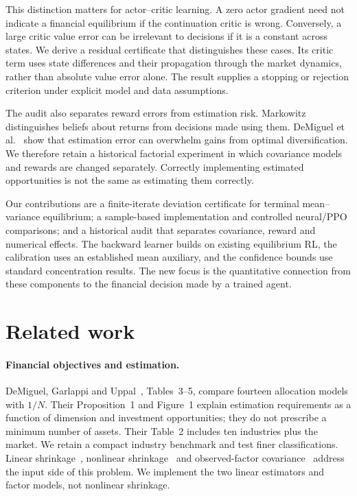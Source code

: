 \documentclass[sigconf,anonymous,review]{acmart}
\begin{document}
This distinction matters for actor--critic learning. A zero actor gradient need not indicate a financial equilibrium if the continuation critic is wrong. Conversely, a large critic value error can be irrelevant to decisions if it is a constant across states. We derive a residual certificate that distinguishes these cases. Its critic term uses state differences and their propagation through the market dynamics, rather than absolute value error alone. The result supplies a stopping or rejection criterion under explicit model and data assumptions.

The audit also separates reward errors from estimation risk. Markowitz~\cite{markowitz1952} distinguishes beliefs about returns from decisions made using them. DeMiguel et al.~\cite{demiguel2009} show that estimation error can overwhelm gains from optimal diversification. We therefore retain a historical factorial experiment in which covariance models and rewards are changed separately. Correctly implementing estimated opportunities is not the same as estimating them correctly.

Our contributions are a finite-iterate deviation certificate for terminal mean--variance equilibrium; a sample-based implementation and controlled neural/PPO comparisons; and a historical audit that separates covariance, reward and numerical effects. The backward learner builds on existing equilibrium RL, the calibration uses an established mean auxiliary, and the confidence bounds use standard concentration results. The new focus is the quantitative connection from these components to the financial decision made by a trained agent.

\section{Related work}
\paragraph{Financial objectives and estimation.}
DeMiguel, Garlappi and Uppal~\cite{demiguel2009}, Tables~3--5, compare fourteen allocation models with $1/N $. Their Proposition~1 and Figure~1 explain estimation requirements as a function of dimension and investment opportunities; they do not prescribe a minimum number of assets. Their Table~2 includes ten industries plus the market. We retain a compact industry benchmark and test finer classifications. Linear shrinkage~\cite{ledoit2004identity,ledoit2004correlation}, nonlinear shrinkage~\cite{ledoit2017} and observed-factor covariance~\cite{fan2008} address the input side of this problem. We implement the two linear estimators and factor models, not nonlinear shrinkage.
\end{document}
